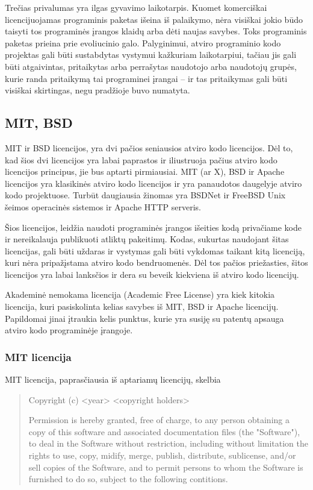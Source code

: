 Trečias privalumas yra ilgas gyvavimo laikotarpis. Kuomet komerciškai licencijuojamas programinis paketas išeina iš palaikymo, nėra visiškai jokio būdo taisyti tos programinės įrangos klaidų arba dėti naujas savybes.
Toks programinis paketas prieina prie evoliucinio galo.
Palyginimui, atviro programinio kodo projektas gali būti sustabdytas vystymui kažkuriam laikotarpiui, tačiau jis gali būti atgaivintas, pritaikytas arba perrašytas naudotojo arba naudotojų grupės, kurie randa pritaikymą tai programinei įrangai -- ir tas pritaikymas gali būti visiškai skirtingas, negu pradžioje buvo numatyta.

\subsection{MIT, BSD}

MIT ir BSD licencijos, yra dvi pačios seniausios atviro kodo licencijos.
Dėl to, kad šios dvi licencijos yra labai paprastos ir iliustruoja pačius atviro kodo licencijos principus, jie bus aptarti pirmiausiai.
MIT (ar X), BSD ir Apache licencijos yra klasikinės atviro kodo licencijos ir yra panaudotos daugelyje atviro kodo projektuose.
Turbūt daugiausia žinomas yra BSDNet ir FreeBSD Unix šeimos operacinės sistemos ir Apache HTTP serveris.

Šios licencijos, leidžia naudoti programinės įrangos išeities kodą privačiame kode ir nereikalauja publikuoti atliktų pakeitimų.
Kodas, sukurtas naudojant šitas licencijas, gali būti uždaras ir vystymas gali būti vykdomas taikant kitą licenciją, kuri nėra pripažįstama atviro kodo bendruomenės.
Dėl tos pačios priežasties, šitos licencijos yra labai lanksčios ir dera su beveik kiekviena iš atviro kodo licencijų.

Akademinė nemokama licencija (Academic Free License) yra kiek kitokia licencija, kuri pasiskolinta kelias savybes iš MIT, BSD ir Apache licencijų.
Papildomai jinai įtraukia kelis punktus, kurie yra susiję su patentų apsauga atviro kodo programinėje įrangoje.

\subsubsection{MIT licencija}

MIT licencija, paprasčiausia iš aptariamų licencijų, skelbia

\begin{quote}
    Copyright (c) <year> <copyright holders>

    Permission is hereby granted, free of charge, to any person obtaining a copy of this software and associated documentation files (the "Software"), to deal in the Software without restriction, including without limitation the rights to use, copy, midify, merge, publish, distribute, sublicense, and/or sell copies of the Software, and to permit persons to whom the Software is furnished to do so, subject to the following contitions.
\end{quote}

